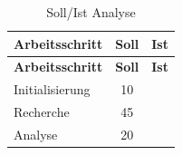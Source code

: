 \begin{longtable}[c]{@{}lcl@{}}
\caption{Soll/Ist Analyse}\tabularnewline
\toprule
\begin{minipage}[b]{0.32\columnwidth}\raggedright\strut
\textbf{Arbeitsschritt}
\strut\end{minipage} &
\begin{minipage}[b]{0.24\columnwidth}\centering\strut
\textbf{Soll}
\strut\end{minipage} &
\begin{minipage}[b]{0.35\columnwidth}\raggedright\strut
\textbf{Ist}
\strut\end{minipage}\tabularnewline
\midrule
\endfirsthead
\toprule
\begin{minipage}[b]{0.32\columnwidth}\raggedright\strut
\textbf{Arbeitsschritt}
\strut\end{minipage} &
\begin{minipage}[b]{0.24\columnwidth}\centering\strut
\textbf{Soll}
\strut\end{minipage} &
\begin{minipage}[b]{0.35\columnwidth}\raggedright\strut
\textbf{Ist}
\strut\end{minipage}\tabularnewline
\midrule
\endhead
\begin{minipage}[t]{0.32\columnwidth}\raggedright\strut
Initialisierung
\strut\end{minipage} &
\begin{minipage}[t]{0.24\columnwidth}\centering\strut
10
\strut\end{minipage} &
\begin{minipage}[t]{0.35\columnwidth}\raggedright\strut
\strut\end{minipage}\tabularnewline
\begin{minipage}[t]{0.32\columnwidth}\raggedright\strut
Recherche
\strut\end{minipage} &
\begin{minipage}[t]{0.24\columnwidth}\centering\strut
45
\strut\end{minipage} &
\begin{minipage}[t]{0.35\columnwidth}\raggedright\strut
\strut\end{minipage}\tabularnewline
\begin{minipage}[t]{0.32\columnwidth}\raggedright\strut
Analyse
\strut\end{minipage} &
\begin{minipage}[t]{0.24\columnwidth}\centering\strut
20
\strut\end{minipage} &
\begin{minipage}[t]{0.35\columnwidth}\raggedright\strut

\end{minipage}
\end{longtable}
